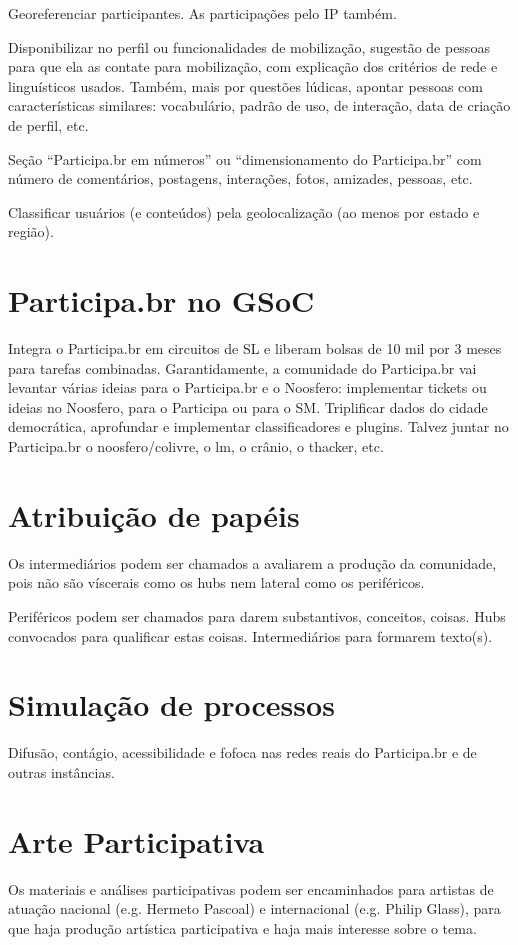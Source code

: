 \documentclass[12pt]{report}
\begin{document}
Georeferenciar participantes. As participações pelo IP também.

Disponibilizar no perfil ou funcionalidades de mobilização, sugestão de pessoas para que ela as contate para mobilização, com explicação dos critérios de rede e linguísticos usados. Também, mais por questões lúdicas, apontar pessoas com características similares: vocabulário, padrão de uso, de interação, data de criação de perfil, etc.

Seção ``Participa.br em números'' ou ``dimensionamento do Participa.br'' com número de comentários, postagens, interações, fotos, amizades, pessoas, etc.

Classificar usuários (e conteúdos) pela geolocalização (ao menos por estado e região).

\chapter{Participa.br no GSoC}
Integra o Participa.br em circuitos de SL e liberam bolsas de 10 mil por 3 meses para tarefas combinadas. Garantidamente, a comunidade do Participa.br vai levantar várias ideias para o Participa.br e o Noosfero: implementar tickets ou ideias no Noosfero, para o Participa ou para o SM. Triplificar dados do cidade democrática, aprofundar e implementar classificadores e plugins. Talvez juntar no Participa.br o noosfero/colivre, o lm, o crânio, o thacker, etc.

\chapter{Atribuição de papéis}
Os intermediários podem ser chamados a avaliarem a produção da comunidade, pois não são víscerais como os hubs nem lateral como os periféricos.

Periféricos podem ser chamados para darem substantivos, conceitos, coisas.
Hubs convocados para qualificar estas coisas. Intermediários para formarem texto(s).
\chapter{Simulação de processos}

Difusão, contágio, acessibilidade e fofoca nas redes reais do Participa.br e de outras instâncias.

\chapter{Arte Participativa}
Os materiais e análises participativas podem ser encaminhados para artistas de atuação nacional (e.g. Hermeto Pascoal) e internacional (e.g. Philip Glass), para que haja produção artística participativa e haja mais interesse sobre o tema.
\end{document}
